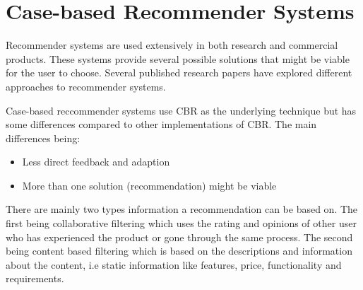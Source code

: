\section{Case-based Recommender Systems}\label{sec:case_based_recommender_systems}
Recommender systems are used extensively in both research and commercial products. These systems provide several possible solutions that might be viable for the user to choose. Several published research papers have explored different approaches to recommender systems\cite{mulyana2015case}\cite{quijano2011happy}.

Case-based reccommender systems use CBR as the underlying technique but has some differences compared to other implementations of CBR. The main differences being:
 
\begin{itemize}
    \item Less direct feedback and adaption
    \item More than one solution (recommendation) might be viable
\end{itemize}

There are mainly two types information a recommendation can be based on. The first being collaborative filtering which uses the rating and opinions of other user who has experienced the product or gone through the same process. The second being content based filtering which is based on the descriptions and information about the content, i.e static information like features, price, functionality and requirements. 










\cleardoublepage